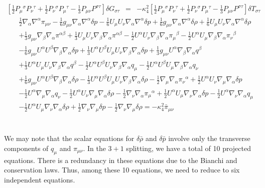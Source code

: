 \documentclass[10pt,letterpaper]{article}
\numberwithin{equation}{section}
\begin{document}
\begin{eqnarray}
\left[\frac12 P_{\mu}{}^\sigma P_\nu{}^\tau + \frac12 P_\nu{}^\sigma P_\mu{}^\tau -\frac13 P_{\mu\nu}P^{\sigma\tau}\right]\delta G_{\sigma\tau} &=& -\kappa^2_4 \left[\frac12 P_{\mu}{}^\sigma P_\nu{}^\tau + \frac12 P_\nu{}^\sigma P_\mu{}^\tau -\frac13 P_{\mu\nu}P^{\sigma\tau}\right]\delta T_{\sigma\tau}
\end{eqnarray}
\begin{eqnarray}
&&\tfrac{1}{2} \nabla_{\alpha}\nabla^{\alpha}\pi_{\mu \nu}
-  \tfrac{1}{6} g_{\mu \nu} \nabla_{\alpha}\nabla^{\alpha}\delta p
-  \tfrac{1}{6} U_{\mu} U_{\nu} \nabla_{\alpha}\nabla^{\alpha}\delta p
+ \tfrac{1}{6} g_{\mu \nu} \nabla_{\alpha}\nabla^{\alpha}\delta \rho
+ \tfrac{1}{6} U_{\mu} U_{\nu} \nabla_{\alpha}\nabla^{\alpha}\delta \rho\nonumber\\
&& + \tfrac{1}{3} g_{\mu \nu} \nabla_{\beta}\nabla_{\alpha}\pi^{\alpha \beta}
+ \tfrac{1}{3} U_{\mu} U_{\nu} \nabla_{\beta}\nabla_{\alpha}\pi^{\alpha \beta}
-  \tfrac{1}{2} U^{\alpha} U_{\nu} \nabla_{\beta}\nabla_{\alpha}\pi_{\mu}{}^{\beta}
-  \tfrac{1}{2} U^{\alpha} U_{\mu} \nabla_{\beta}\nabla_{\alpha}\pi_{\nu}{}^{\beta}\nonumber\\
&& -  \tfrac{1}{6} g_{\mu \nu} U^{\alpha} U^{\beta} \nabla_{\beta}\nabla_{\alpha}\delta p
+ \tfrac{1}{3} U^{\alpha} U^{\beta} U_{\mu} U_{\nu} \nabla_{\beta}\nabla_{\alpha}\delta p
+ \tfrac{1}{3} g_{\mu \nu} U^{\alpha} \nabla_{\beta}\nabla_{\alpha}q^{\beta}\nonumber\\
&& + \tfrac{1}{3} U^{\alpha} U_{\mu} U_{\nu} \nabla_{\beta}\nabla_{\alpha}q^{\beta}
-  \tfrac{1}{2} U^{\alpha} U^{\beta} U_{\nu} \nabla_{\beta}\nabla_{\alpha}q_{\mu}
-  \tfrac{1}{2} U^{\alpha} U^{\beta} U_{\mu} \nabla_{\beta}\nabla_{\alpha}q_{\nu}\nonumber\\
&& + \tfrac{1}{6} g_{\mu \nu} U^{\alpha} U^{\beta} \nabla_{\beta}\nabla_{\alpha}\delta \rho
-  \tfrac{1}{3} U^{\alpha} U^{\beta} U_{\mu} U_{\nu} \nabla_{\beta}\nabla_{\alpha}\delta \rho
-  \tfrac{1}{2} \nabla_{\mu}\nabla_{\alpha}\pi_{\nu}{}^{\alpha}
+ \tfrac{1}{2} U^{\alpha} U_{\nu} \nabla_{\mu}\nabla_{\alpha}\delta p\nonumber\\
&& -  \tfrac{1}{2} U^{\alpha} \nabla_{\mu}\nabla_{\alpha}q_{\nu}
-  \tfrac{1}{2} U^{\alpha} U_{\nu} \nabla_{\mu}\nabla_{\alpha}\delta \rho
-  \tfrac{1}{2} \nabla_{\nu}\nabla_{\alpha}\pi_{\mu}{}^{\alpha}
+ \tfrac{1}{2} U^{\alpha} U_{\mu} \nabla_{\nu}\nabla_{\alpha}\delta p
-  \tfrac{1}{2} U^{\alpha} \nabla_{\nu}\nabla_{\alpha}q_{\mu}\nonumber\\
&& -  \tfrac{1}{2} U^{\alpha} U_{\mu} \nabla_{\nu}\nabla_{\alpha}\delta \rho
+ \tfrac{1}{2} \nabla_{\nu}\nabla_{\mu}\delta p
-  \tfrac{1}{2} \nabla_{\nu}\nabla_{\mu}\delta \rho = -\kappa^2_4 \bar \pi_{\mu\nu} 
\end{eqnarray}
\\ \\
We may note that the scalar equations for $\delta \bar\rho$ and $\delta \bar p$ involve only the transverse components of $q_\mu$ and $\pi_{\mu\nu}$. In the $3+1$ splitting, we have a total of 10 projected equations. There is a redundancy in these equations due to the Bianchi and conservation laws. Thus, among these 10 equations, we need to reduce to six independent equations. 
\end{document}
